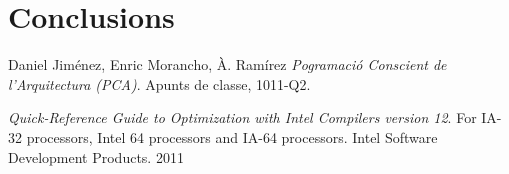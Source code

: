 \documentclass[final,a4paper,11pt]{report}
\begin{document}


\tableofcontents
\newpage





\chapter{Conclusions}

\begin{thebibliography}{9}

  Daniel Jiménez, Enric Morancho, À. Ramírez
  \emph{Pogramació Conscient de l'Arquitectura (PCA)}.
  Apunts de classe,
  1011-Q2.

  \emph{Quick-Reference Guide to Optimization with Intel Compilers version 12}. For IA-32 processors, Intel 64 processors and IA-64 processors. Intel Software Development Products. 2011


\end{thebibliography}
\end{document}
